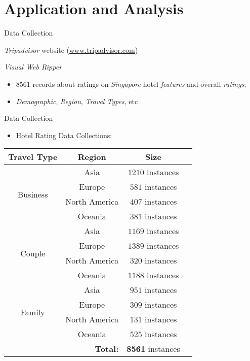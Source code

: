 \documentclass[
 size=12pt,
 paper=smartboard, %
 mode=present, %
 display=slides, %
 style=tulip,  %
 pauseslide,
 fleqn,leqno,clock]{powerdot}
\begin{document}
\section{Application and Analysis}

\begin{slide}{Data Collection}
\begin{description}[type=1]
\item[Source] <1-> 
\emph{Tripadvisor} website (\url{www.tripadvisor.com})
\item[Extractor] <2-> 
\emph{Visual Web Ripper} %
\item[Data] <3-> 
\begin{itemize}
 \item<4-> $8561$ records about ratings on \emph{Singapore} hotel \emph{features} and overall \emph{ratings};
 \item<5-> \emph{Demographic}, \emph{Region}, \emph{Travel Types}, etc
\end{itemize} 
\end{description}
\end{slide}

\begin{slide}[toc=,bm=]{Data Collection}
\begin{itemize}
 \item<1-> Hotel Rating Data Collections:
\end{itemize}
{ \footnotesize \centering
\begin{tabular}{cccr}
\toprule
\textbf{Travel Type} & \textbf{Region} & \multicolumn{1}{c}{\textbf{Size}}\\
\midrule
\multirow{4}{*}{Business}  & Asia & $1210$ instances\\
  & Europe & $581$ instances\\
  & North America & $407$ instances \\
  & Oceania & $381$ instances\\
\midrule
      \multirow{4}{*}{Couple}  & Asia & $1169$ instances\\
 & Europe & $1389$ instances\\
 &North America & $320$ instances\\
  & Oceania & $1188$ instances\\
\midrule
        \multirow{4}{*}{Family}  & Asia & $951$ instances\\
 & Europe & $309$ instances\\
& North America & $131$ instances\\
  & Oceania & $525$ instances\\
\midrule
\multicolumn{2}{r}{\textbf{Total:}} & \textbf{8561} instances \\
\bottomrule
\end{tabular}
}
\end{slide}
\end{document}
